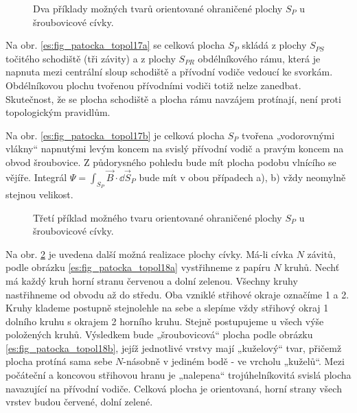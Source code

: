         \begin{figure}[ht!]
          \centering  
          \caption{Dva příklady možných tvarů orientované ohraničené plochy \(S_P\) u šroubovicové 
                   cívky.\cite[s.~57]{Patocka4}} 
          \label{es:fig_patocka_topol17}
        \end{figure}

        Na obr. \ref{es:fig_patocka_topol17a} se celková plocha \(S_P\) skládá z plochy \(S_{PS}\) 
        točitého schodiště (tři závity) a z plochy \(S_{PR}\) obdélníkového rámu, která je napnuta 
        mezi centrální sloup schodiště a přívodní vodiče vedoucí ke svorkám. Obdélníkovou plochu 
        tvořenou přívodními vodiči totiž nelze zanedbat. Skutečnost, že se plocha schodiště a 
        plocha rámu navzájem protínají, není proti topologickým pravidlům. 
        
        Na obr. \ref{es:fig_patocka_topol17b} je celková plocha \(S_P\) tvořena „vodorovnými 
        vlákny“ napnutými levým koncem na svislý přívodní vodič a pravým koncem na obvod 
        šroubovice. Z půdorysného pohledu bude mít plocha podobu vlnícího se vějíře. Integrál 
        \(\Psi = \int_{S_P}\vec{B}\cdot \dd{\vec{S}}_P\) bude mít v obou případech a), b) vždy neomylně 
        stejnou velikost. 

        \begin{figure}[ht!]
          \centering  
          \caption{Třetí příklad možného tvaru orientované ohraničené plochy \(S_P\) u šroubovicové 
                   cívky. \cite[s.~58]{Patocka4}} 
          \label{es:fig_patocka_topol18}
        \end{figure}

        Na obr. \ref{es:fig_patocka_topol18} je uvedena další možná realizace plochy cívky. Má-li 
        cívka \(N\) závitů, podle obrázku \ref{es:fig_patocka_topol18a} vystřihneme z papíru \(N\) 
        kruhů. Nechť má každý kruh horní stranu červenou a dolní zelenou. Všechny kruhy nastřihneme 
        od obvodu až do středu. Oba vzniklé střihové okraje označíme 1 a 2. Kruhy klademe postupně 
        stejnolehle na sebe a slepíme vždy střihový okraj 1 dolního kruhu s okrajem 2 horního 
        kruhu. Stejně postupujeme u všech výše položených kruhů. Výsledkem bude „šroubovicová“ 
        plocha podle obrázku \ref{es:fig_patocka_topol18b}, jejíž jednotlivé vrstvy mají „kuželový“ 
        tvar, přičemž plocha protíná sama sebe \(N\)-násobně v jediném bodě - ve vrcholu „kuželů“. 
        Mezi počáteční a koncovou střihovou hranu je „nalepena“ trojúhelníkovitá svislá plocha 
        navazující na přívodní vodiče. Celková plocha je orientovaná, horní strany všech vrstev 
        budou červené, dolní zelené.
      
